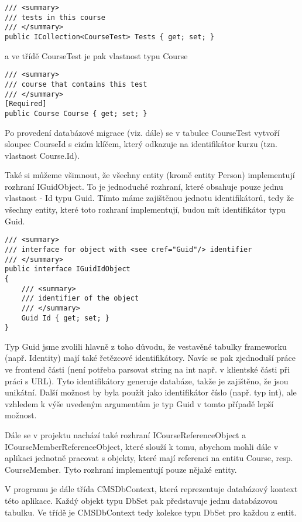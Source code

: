 \begin{lstlisting}
/// <summary>
/// tests in this course
/// </summary>
public ICollection<CourseTest> Tests { get; set; }
\end{lstlisting}

a ve třídě CourseTest je pak vlastnost typu Course

\begin{lstlisting}
/// <summary>
/// course that contains this test
/// </summary>
[Required]
public Course Course { get; set; }
\end{lstlisting}

Po provedení databázové migrace (viz. dále) se v tabulce CourseTest vytvoří sloupec CourseId s cizím klíčem, který odkazuje na identifikátor kurzu (tzn. vlastnost Course.Id).

Také si můžeme všimnout, že všechny entity (kromě entity Person) implementují rozhraní IGuidObject. To je jednoduché rozhraní, které obsahuje pouze jednu vlastnost - Id typu Guid. Tímto máme zajištěnou jednotu identifikátorů, tedy že všechny entity, které toto rozhraní implementují, budou mít identifikátor typu Guid.

\begin{lstlisting}
/// <summary>
/// interface for object with <see cref="Guid"/> identifier
/// </summary>
public interface IGuidIdObject
{
	/// <summary>
	/// identifier of the object
	/// </summary>
	Guid Id { get; set; }
}
\end{lstlisting}


Typ Guid jsme zvolili hlavně z toho důvodu, že vestavěné tabulky frameworku (např. Identity) mají také řetězcové identifikátory. Navíc se pak zjednoduší práce ve frontend části (není potřeba parsovat string na int např. v klientské části při práci s URL). Tyto identifikátory generuje databáze, takže je zajištěno, že jsou unikátní.
Další možnost by byla použít jako identifikátor číslo (např. typ int), ale vzhledem k výše uvedeným argumentům je typ Guid v tomto případě lepší možnost.

Dále se v projektu nachází také rozhraní ICourseReferenceObject a ICourseMemberReferenceObject, které slouží k tomu, abychom mohli dále v aplikaci jednotně pracovat s objekty, které mají referenci na entitu Course, resp. CourseMember. Tyto rozhraní implementují pouze nějaké entity.

V programu je dále třída CMSDbContext, která reprezentuje databázový kontext této aplikace. Každý objekt typu DbSet pak představuje jednu databázovou tabulku. Ve třídě je CMSDbContext tedy kolekce typu DbSet pro každou z entit.

